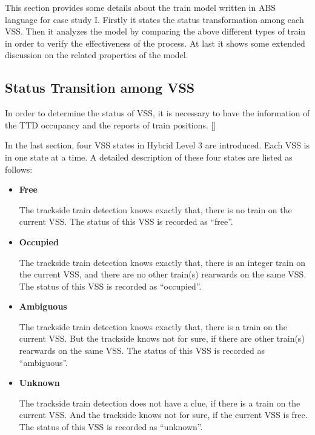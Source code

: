 \documentclass[article,dr=phil,type=drfinal,colorback,accentcolor=tud9c]{tudthesis}
\begin{document}
  This section provides some details about the train model written in ABS language for case study I. Firstly it states the status transformation among each VSS. Then it analyzes the model by comparing the above different types of train in order to verify the effectiveness of the process. At last it shows some extended discussion on the related properties of the model.
  
  \subsection{Status Transition among VSS}
  
  In order to determine the status of VSS, it is necessary to have the information of the TTD occupancy and the reports of train positions. []
  
  In the last section, four VSS states in Hybrid Level 3 are introduced. Each VSS is in one state at a time. A detailed description of these four states are listed as follows:
  
  \begin{itemize}
  	
  \item \textbf{Free}
  
  The trackside train detection knows exactly that, there is no train on the current VSS. The status of this VSS is recorded as ``free''.
  
  \item \textbf{Occupied}
  
  The trackside train detection knows exactly that, there is an integer train on the current VSS, and there are no other train(s) rearwards on the same VSS. The status of this VSS is recorded as ``occupied''.
  
  \item \textbf{Ambiguous}
  
  The trackside train detection knows exactly that, there is a train on the current VSS. But the trackside knows not for sure, if there are other train(s) rearwards on the same VSS. The status of this VSS is recorded as ``ambiguous''.  
    
  \item \textbf{Unknown}  
  
  The trackside train detection does not have a clue, if there is a train on the current VSS. And the trackside knows not for sure, if the current VSS is free. The status of this VSS is recorded as ``unknown''.
  
  \end{itemize}
\end{document}

